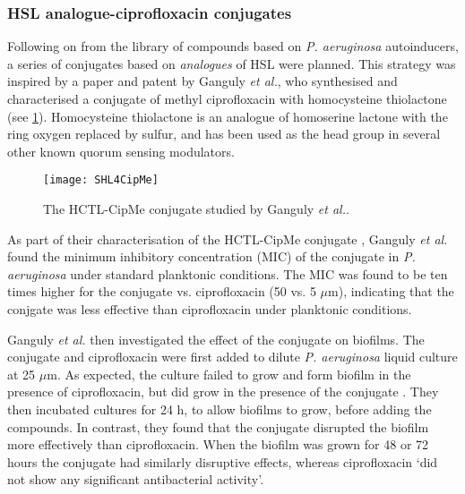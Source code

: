 \subsubsection{HSL analogue-ciprofloxacin conjugates\label{sec:AIA_intro}}

Following on from the library of compounds based on \textit{P. aeruginosa} autoinducers, a series of conjugates based on \textit{analogues} of HSL were planned. This strategy was inspired by a paper\cite{Ganguly2011} and patent\cite{Iyer2012} by Ganguly \textit{et al.}, who synthesised and characterised a conjugate  of methyl ciprofloxacin with homocysteine thiolactone (see \ref{fgr:SHL4CipMe}). Homocysteine thiolactone is an analogue of homoserine lactone with the ring oxygen replaced by sulfur, and has been used as the head group in several other known quorum sensing modulators\cite{Eberhard1986,Schaefer1996,Passador1996,Smith2003,Chhabra1993,McInnis2011,Geske2007,Janssens2007}.


\begin{figure}[H]
	\begin{center}
		\texttt{[image: SHL4CipMe]}
		\caption{The HCTL-CipMe conjugate  studied by Ganguly \textit{et al.}\cite{Ganguly2011,Iyer2012}.\label{fgr:SHL4CipMe}}
	\end{center}
\end{figure}


As part of their characterisation of the HCTL-CipMe conjugate , Ganguly \textit{et al.} found the minimum inhibitory concentration (MIC) of the conjugate in \textit{P. aeruginosa} under standard planktonic conditions. 
The MIC was found to be ten times higher for the conjugate vs. ciprofloxacin (50 vs. 5 $\mu$m), indicating that the conjgate was less effective than ciprofloxacin under planktonic conditions. 

Ganguly \textit{et al.} then investigated the effect of the conjugate on biofilms. 
The conjugate and ciprofloxacin were first added to dilute \textit{P. aeruginosa} liquid culture at 25 $\mu$m. 
As expected, the culture failed to grow and form biofilm in the presence of ciprofloxacin, but did grow in the presence of the conjugate . 
They then incubated cultures for 24 h, to allow biofilms to grow, before adding the compounds. In contrast, they found that the conjugate  disrupted the biofilm more effectively than ciprofloxacin. 
When the biofilm was grown for 48 or 72 hours the conjugate had similarly disruptive effects, whereas ciprofloxacin `did not show any significant antibacterial activity'.

